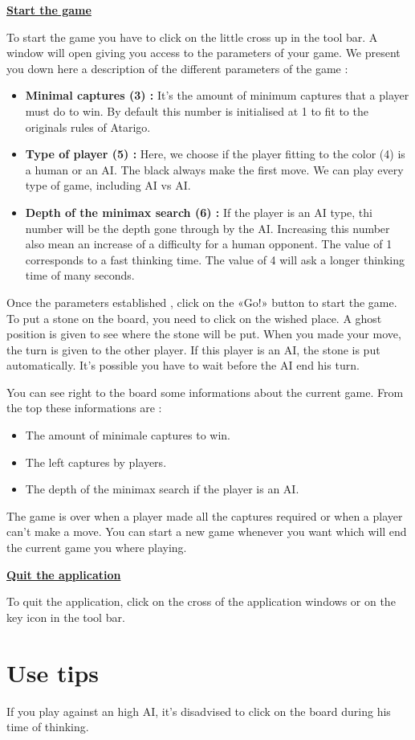 \documentclass[a4paper]{ltxguide}
\begin{document}
\Paragraph\textbf{\underline{Start the game}}

To start the game you have to click on the little cross up in the tool bar. A window will open giving you access to the parameters of your game. We present you down here a description of the different parameters of the game :

\begin{itemize}
\item\textbf{Minimal captures (3) :}  It's  the amount of minimum captures that a player must do to win. By default this number is initialised at 1 to fit to the originals rules of Atarigo.

\item\textbf{Type of player (5) :} Here, we choose if the player fitting to the color (4) is a human or an AI. The black always make the first move. We can play every type of game, including AI vs AI.

\item\textbf{Depth of the minimax search (6) :} If the player is an AI type, thi number will be the depth gone through by the AI. Increasing this number also mean an increase of a difficulty for a human opponent. The value of 1 corresponds to a fast thinking time. The value of 4 will ask a longer thinking time of many seconds.
\end{itemize}

	Once the parameters established , click on the «Go!» button to start the game. To put a stone on the board, you need to click on the wished place. A ghost position is given to see where the stone will be put. When you made your move, the turn is given to the other player. If this player is an AI, the stone is put automatically. It's possible you have to wait before the AI end his turn.

	You can see right to the board some informations about the current game. From the top these informations are :

	\begin{itemize}
	\item{The amount of minimale captures to win.}

	\item{The left captures by players.}

	\item{The depth of the minimax search if the player is an AI.}
	\end{itemize}

    The game is over when a player made all the captures required or when a player can't make a move. You can start a new game whenever you want which will end the current game you where playing.


\Paragraph\textbf{\underline{Quit the application}}

    To quit the application, click on the cross of the application windows or on the key icon in the tool bar.

\section{Use tips}

    If you play against an high AI, it's disadvised to click on the board during his time of thinking.
\end{document}
